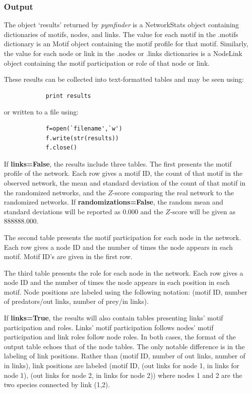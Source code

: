 \documentclass[12pt]{article}
\begin{document}
		\subsubsection{Output}
			The object `results' returned by \emph{pymfinder} is a NetworkStats object containing dictionaries of motifs, nodes, and links. The value for each motif in the .motifs dictionary is an Motif object containing the motif profile for that motif. Similarly, the value for each node or link in the .nodes or .links dictionaries is a NodeLink object containing the motif participation or role of that node or link.

			These results can be collected into text-formatted tables and may be seen using:
			\begin{lstlisting}
			print results
			\end{lstlisting}
			
			or written to a file using:
			\begin{lstlisting}
			f=open(`filename',`w')
			f.write(str(results))
			f.close()
			\end{lstlisting}

			If \textbf{links=False}, the results include three tables. The first presents the motif profile of the network. Each row gives a motif ID, the count of that motif in the observed network, the mean and standard deviation of the count of that motif in the randomized networks, and the $Z$-score comparing the real network to the randomized networks. If \textbf{randomizations=False}, the random mean and standard deviations will be reported as 0.000 and the $Z$-score will be given as 888888.000.
			
			The second table presents the motif participation for each node in the network. Each row gives a node ID and the number of times the node appears in each motif. Motif ID's are given in the first row.
			
			The third table presents the role for each node in the network. Each row gives a node ID and the number of times the node appears in each position in each motif. Node positions are labeled using the following notation: (motif ID, number of predators/out links, number of prey/in links).

			If \textbf{links=True}, the results will also contain tables presenting links' motif participation and roles. Links' motif participation follows nodes' motif participation and link roles follow node roles. In both cases, the format of the output table echoes that of the node tables. The only notable difference is in the labeling of link positions. Rather than (motif ID, number of out links, number of in links), link positions are labeled (motif ID, (out links for node 1, in links for node 1), (out links for node 2, in links for node 2)) where nodes 1 and 2 are the two species connected by link (1,2).
\end{document}
